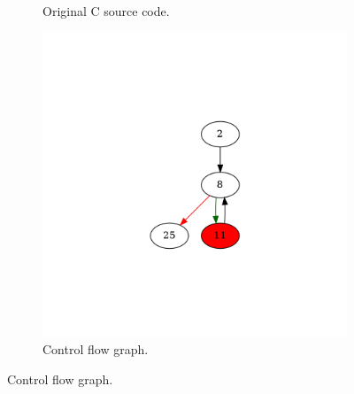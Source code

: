 \begin{figure}[htbp]
	\centering
	\begin{subfigure}[b]{0.48\textwidth}
		\centering
		
		\caption{Original C source code.}
	\end{subfigure}
	\begin{subfigure}[b]{0.50\textwidth}
		\centering
		\includegraphics[width=\textwidth]{inc/appendices/examples/hammock/example/without-break/main_0002b.png}
		\caption{Control flow graph.}
	\end{subfigure}
\end{figure}

